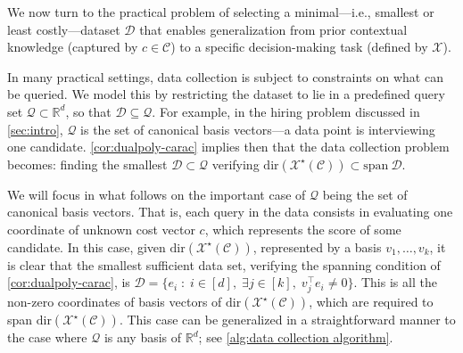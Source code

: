 \documentclass[11pt]{article}
\theoremstyle{plain}
\newtheorem{proposition}{Proposition}
\theoremstyle{definition}
\newcommand{\R}[0]{\mathbb R}
\newcommand{\Vect}{\mathrm{span}~}
\newcommand{\cQ}{\mathcal Q}
\newcommand{\dualpoly}[2]{#1^\star\left(#2\right)}
\newcommand{\cX}{\mathcal{X}}
\newcommand{\cC}{\mathcal{C}}
\newcommand{\cD}{\mathcal{D}}
\renewcommand{\Re}{\mathbb{R}}
\newcommand{\dir}[1]{\mathrm{dir}\left(#1\right)}
\begin{document}


We now turn to the practical problem of selecting a minimal---i.e., smallest or least costly---dataset $\cD$ that enables generalization from prior contextual knowledge (captured by \(c \in \mathcal{C}\)) to a specific decision-making task (defined by \(\mathcal{X}\)). 

In many practical settings, data collection is subject to constraints on what can be queried. We model this by restricting the dataset to lie in a predefined query set \(\mathcal{Q} \subset \mathbb{R}^d\), so that \(\mathcal{D} \subseteq \mathcal{Q}\). For example, in the hiring problem discussed in \cref{sec:intro}, $\cQ$ is the set of canonical basis vectors---a data point is interviewing one candidate. \cref{cor:dualpoly-carac} implies then that the data collection problem becomes: finding the smallest $\cD \subset \cQ$ verifying $\dir{\dualpoly{\cX}{\cC}} \subset \Vect \cD$. 


We will focus in what follows on the important case of $\cQ$ being the set of canonical basis vectors. That is, each query in the data consists in evaluating one coordinate of unknown cost vector $c$, which represents the score of some candidate. In this case, given $\dir{\dualpoly{\cX}{\cC}}$, represented by a basis $v_1,\ldots,v_k$, it is clear that the smallest sufficient data set, verifying the spanning condition of \cref{cor:dualpoly-carac}, is $\cD = \{ e_i \; : \; i \in [d], \; \exists j \in [k], \; v_j^\top e_i \neq 0 \}$. This is all the non-zero coordinates of basis vectors of $\dir{\dualpoly{\cX}{\cC}}$, which are required to span $\dir{\dualpoly{\cX}{\cC}}$. This case can be generalized in a straightforward manner to the case where $\cQ$ is any basis of $\Re^d$; see \cref{alg:data collection algorithm}.
\end{document}
